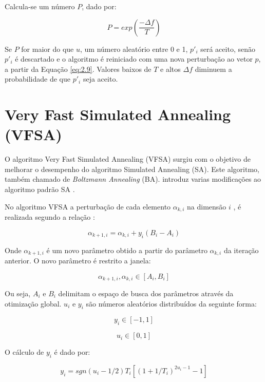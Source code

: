 Calcula-se um número $P$, dado por:

\begin{equation}
\label{eq:2.10}
 P=exp(\frac{-\Delta f}{T})
\end{equation}

Se $P$ for maior do que $u$, um número aleatório entre 0 e 1, $p'_i$ será aceito, senão $p'_i$ é
descartado e o algoritmo é reiniciado com uma nova perturbação ao vetor $p$, a partir da Equação
\ref{eq:2.9}.
Valores baixos de $T$ e altos $\Delta f$ diminuem a probabilidade de que $p'_i$ seja aceito.

\section{Very Fast Simulated Annealing (VFSA)}
\label{sec:2.1}
O algoritmo Very
Fast Simulated Annealing (VFSA) surgiu com o objetivo de melhorar o desempenho do algoritmo Simulated Annealing (SA). 
Este algoritmo, também chamado de \textit{Boltzmann Annealing} (BA).
introduz varias modificações ao
algoritmo padrão SA \cite{ingber}.

No algoritmo VFSA a perturbação de cada elemento $\alpha_{k,i}$ na dimensão $i$ , é realizada
segundo a relação \cite{klaus}:

\begin{equation}
\label{eq:2.11}
 \alpha_{k+1,i}=\alpha_{k,i}+y_i(B_i-A_i)
\end{equation}

Onde $\alpha_{k+1,i}$ é um novo parâmetro obtido a partir do parâmetro $\alpha_{k,i}$ da iteração anterior.
O novo parâmetro é restrito a janela:

\begin{equation}
\label{eq:2.12}
  \alpha_{k+1,i},\alpha_{k,i}\in[A_i,B_i]
\end{equation}

Ou seja, $A_i$ e $B_i$ delimitam o espaço de busca dos parâmetros através da otimização global. 
$u_i$ e $y_i$ são números aleatórios distribuídos da seguinte forma:

\begin{equation}
\label{eq:2.13}
  y_i\in[-1,1]
\end{equation}

\begin{equation}
\label{eq:2.14}
  u_i\in[0,1]
\end{equation}

O cálculo de $y_i$ é dado por:

\begin{equation}
\label{eq:2.15}
  y_i=sgn(u_i-1/2)T_i[(1+1/T_i)^{2u_i-1}-1]
\end{equation}

